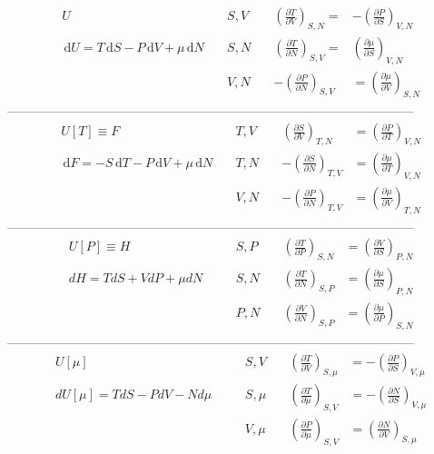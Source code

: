 \begin{align}
	&U \quad &S, V \quad & \left( \frac{\partial T}{\partial V} \right)_{S, N} =& -\left( \frac{\partial P}{\partial S} \right)_{V, N} \label{equ7.3} \\
	&\,\mathrm dU = T\,\mathrm dS - P\,\mathrm dV + \mu \,\mathrm dN \quad & S, N \quad & \left( \frac{\partial T}{\partial N} \right)_{S, V} =& \left( \frac{\partial \mu}{\partial S} \right)_{V, N} \label{equ7.4} \\
	&\phantom{dU = TdS - PdV + \mu dN \quad} & V, N \quad & -\left( \frac{\partial P}{\partial N} \right)_{S, V} &= \left( \frac{\partial \mu}{\partial V} \right)_{S, N} \label{equ7.5}
\end{align}
————————————————————————————————
\begin{align}
	&U[T]\equiv F & T, V \quad & \left(\frac{\partial S}{\partial V} \right)_{T, N} &= \left( \frac{\partial P}{\partial T} \right)_{V, N} \label{equ7.6} \\
	&\,\mathrm dF = -S\,\mathrm dT - P\,\mathrm dV + \mu \,\mathrm dN \quad & T, N \quad & -\left(\frac{\partial S}{\partial N}\right)_{T, V} &= \left(\frac{\partial \mu}{\partial T} \right)_{V, N} \label{equ7.7} \\
	&\phantom{dF = -SdT - PdV + \mu dN \quad} & V, N \quad & -\left( \frac{\partial P}{\partial N} \right)_{T, V} &= \left( \frac{\partial \mu}{\partial V} \right)_{T, N} \label{equ7.8}
\end{align}
————————————————————————————————
\begin{align}
	& U[P] \equiv H \quad & S, P \quad & \left( \frac{\partial T}{\partial P} \right)_{S, N} &= \left( \frac{\partial V}{\partial S} \right)_{P, N} \label{equ7.9} \\
	&dH = TdS + VdP + \mu dN \quad & S, N \quad & \left( \frac{\partial T}{\partial N} \right)_{S, P} &= \left( \frac{\partial \mu}{\partial S} \right)_{P, N} \label{equ7.10} \\
	&\phantom{\,\mathrm dH = T\,\mathrm dS + V\,\mathrm dP + \mu \,\mathrm dN \quad} & P, N \quad & \left(\frac{\partial V}{\partial N} \right)_{S, P} &= \left( \frac{\partial \mu}{\partial P} \right)_{S, N} \label{equ7.11} 
\end{align}
————————————————————————————————
\begin{align}
	& U[\mu] \quad & S, V \quad & \left(\frac{\partial T}{\partial V} \right)_{S, \mu} &= -\left( \frac{\partial P}{\partial S} \right)_{V, \mu} \label{equ7.12} \\
	& dU[\mu] = TdS - PdV - Nd\mu \quad & S, \mu \quad & \left(\frac{\partial T}{\partial \mu} \right)_{S, V} &= -\left( \frac{\partial N}{\partial S} \right)_{V, \mu} \label{equ7.13} \\
	& \phantom{\,\mathrm dU[\mu] = T\,\mathrm dS - P\,\mathrm dV - N\,\mathrm d\mu \quad} & V, \mu \quad & \left(\frac{\partial P}{\partial \mu} \right)_{S, V} &= \left( \frac{\partial N}{\partial V} \right)_{S, \mu} \label{equ7.14}
\end{align}
